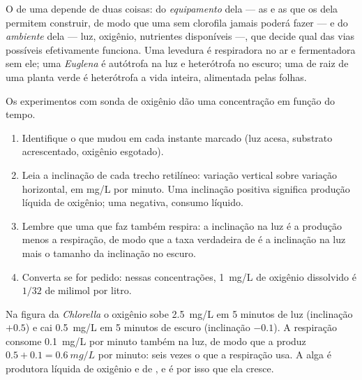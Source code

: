 \begin{proposition}\label{prop:g10:cell-metabolism:decides}
O  de uma  depende de duas coisas: do
\emph{equipamento} dela --- as  e as  que os 
dela permitem construir, de modo que uma  sem clorofila jamais
poderá fazer  --- e do \emph{ambiente} dela --- luz,
oxigênio, nutrientes disponíveis ---, que decide qual das vias
possíveis efetivamente funciona. Uma levedura é respiradora no ar e
fermentadora sem ele; uma \emph{Euglena} é autótrofa na luz e
heterótrofa no escuro; uma  de raiz de uma planta verde é
heterótrofa a vida inteira, alimentada pelas folhas.
\end{proposition}
\admitted

\begin{method}\label{met:g10:cell-metabolism:trace}
Os experimentos com sonda de oxigênio dão uma concentração em função do
tempo.
\begin{enumerate}
  \item Identifique o que mudou em cada instante marcado (luz acesa,
        substrato acrescentado, oxigênio esgotado).
  \item Leia a inclinação de cada trecho retilíneo: variação vertical
        sobre variação horizontal, em \unit{mg/L} por minuto. Uma
        inclinação positiva significa produção líquida de oxigênio;
        uma negativa, consumo líquido.
  \item Lembre que uma  que faz  também respira: a
        inclinação na luz é a produção menos a respiração, de modo que
        a taxa verdadeira de  é a inclinação na luz mais o
        tamanho da inclinação no escuro.
  \item Converta se for pedido: nessas concentrações, \qty{1}{mg/L} de
        oxigênio dissolvido é $1/32$ de milimol por litro.
\end{enumerate}
\end{method}

\begin{example}\label{ex:g10:cell-metabolism:truerate}
Na figura da \emph{Chlorella} o oxigênio sobe \qty{2.5}{mg/L} em 5
minutos de luz (inclinação $+0.5$) e cai \qty{0.5}{mg/L} em 5 minutos
de escuro (inclinação $-0.1$). A respiração consome \qty{0.1}{mg/L} por
minuto também na luz, de modo que a  produz
$0.5 + 0.1 = \qty{0.6}{mg/L}$ por minuto: seis vezes o que a respiração
usa. A alga é produtora líquida de oxigênio e de , e é
por isso que ela cresce.
\end{example}

